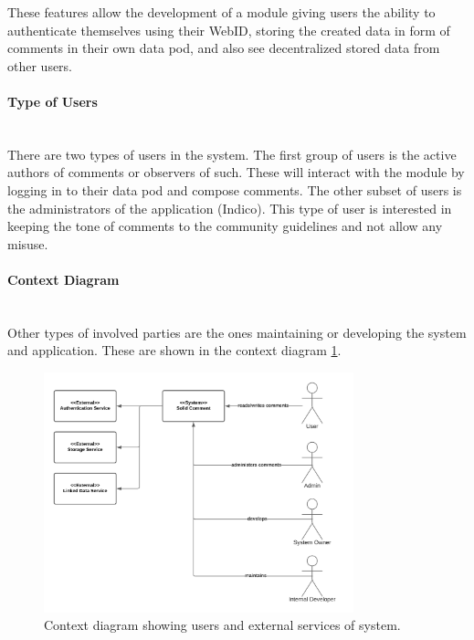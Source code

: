 These features allow the development of a module giving users the ability to authenticate themselves using their WebID, storing the created data in form of comments in their own data pod, and also see decentralized stored data from other users.

\paragraph{Type of Users}\mbox{}\\

There are two types of users in the system. The first group of users is the active authors of comments or observers of such. These will interact with the module by logging in to their data pod and compose comments. The other subset of users is the administrators of the application (Indico). This type of user is interested in keeping the tone of comments to the community guidelines and not allow any misuse.

\paragraph{Context Diagram}\mbox{}\\

Other types of involved parties are the ones maintaining or developing the system and application. These are shown in the context diagram \ref{fig:poc-comment-context_diagram}.

\begin{figure}[H]
    \centering
    \includegraphics[width=0.8\textwidth]{prototype/graphs/poc-comment-context_diagram.png}
    \caption{Context diagram showing users and external services of system.}
    \label{fig:poc-comment-context_diagram}
\end{figure}

